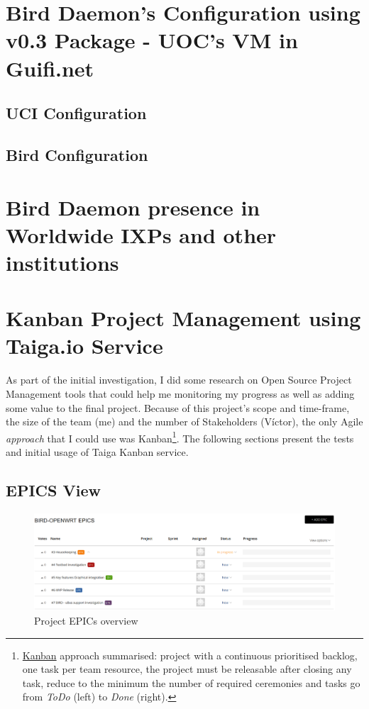 \newpage
\begin{appendices}
\appendixpage
\noappendicestocpagenum
\addappheadtotoc
{}

\chapter{Bird Daemon's Configuration using v0.3 Package - UOC's VM in Guifi.net}
\label{app:ch:bdcuoc}

\section{UCI Configuration}


\section{Bird Configuration}



\chapter{Bird Daemon presence in Worldwide IXPs and other institutions}
\label{app:ch:blinks}

\chapter{Kanban Project Management using Taiga.io Service}
\label{app:sec:kanban}
As part of the initial investigation, I did some research on Open Source Project Management tools that could help me monitoring my progress as well as adding some value to the final project.
Because of this project's scope and time-frame, the size of the team (me) and the number of Stakeholders (Víctor), the only Agile \textit{approach} that I could use was Kanban\footnote{\href{http://www.scrumhub.com/kanban-fundamentals/}{Kanban} approach summarised: project with a continuous prioritised backlog, one task per team resource, the project must be releasable after closing any task, reduce to the minimum the number of required ceremonies and tasks go from \textit{ToDo} (left) to \textit{Done} (right).}. The following sections present the tests and initial usage of Taiga Kanban service.

\begin{landscape}
\section{EPICS View}
\begin{figure}[h!]
\centering
    \includegraphics[width=\hsize]{images/kanban/epics}
    \caption{Project EPICs overview}
    \label{fig:kepic}
\end{figure}


\end{landscape}
\end{appendices}
